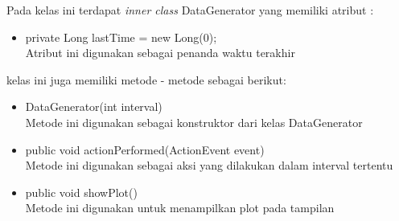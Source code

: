 Pada kelas ini terdapat {\it inner class} DataGenerator yang memiliki atribut :
\begin{itemize}
	\item private Long lastTime = new Long(0);\\
		Atribut ini digunakan sebagai penanda waktu terakhir
\end{itemize}
kelas ini juga memiliki metode - metode sebagai berikut:
\begin{itemize}
	\item DataGenerator(int interval) \\
		Metode ini digunakan sebagai konstruktor dari kelas DataGenerator
	\item public void actionPerformed(ActionEvent event) \\
		Metode ini digunakan sebagai aksi yang dilakukan dalam interval tertentu
	\item public void showPlot()\\
		Metode ini digunakan untuk menampilkan plot pada tampilan
\end{itemize}

